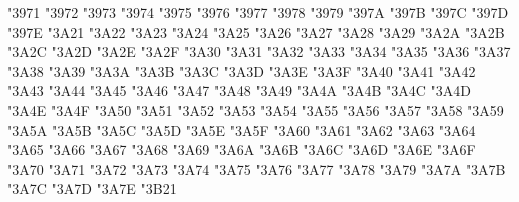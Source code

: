 {\Uchar\jis"3971 %
\Uchar\jis"3972 %
\Uchar\jis"3973 %
\Uchar\jis"3974 %
\Uchar\jis"3975 %
\Uchar\jis"3976 %
\Uchar\jis"3977 %
\Uchar\jis"3978 %
\Uchar\jis"3979 %
\Uchar\jis"397A %
\Uchar\jis"397B %
\Uchar\jis"397C %
\Uchar\jis"397D %
\Uchar\jis"397E %
\Uchar\jis"3A21 %
\Uchar\jis"3A22 %
\Uchar\jis"3A23 %
\Uchar\jis"3A24 %
\Uchar\jis"3A25 %
\Uchar\jis"3A26 %
\Uchar\jis"3A27 %
\Uchar\jis"3A28 %
\Uchar\jis"3A29 %
\Uchar\jis"3A2A %
\Uchar\jis"3A2B %
\Uchar\jis"3A2C %
\Uchar\jis"3A2D %
\Uchar\jis"3A2E %
\Uchar\jis"3A2F %
\Uchar\jis"3A30 %
\Uchar\jis"3A31 %
\Uchar\jis"3A32 %
\Uchar\jis"3A33 %
\Uchar\jis"3A34 %
\Uchar\jis"3A35 %
\Uchar\jis"3A36 %
\Uchar\jis"3A37 %
\Uchar\jis"3A38 %
\Uchar\jis"3A39 %
\Uchar\jis"3A3A %
\Uchar\jis"3A3B %
\Uchar\jis"3A3C %
\Uchar\jis"3A3D %
\Uchar\jis"3A3E %
\Uchar\jis"3A3F %
\Uchar\jis"3A40 %
\Uchar\jis"3A41 %
\Uchar\jis"3A42 %
\Uchar\jis"3A43 %
\Uchar\jis"3A44 %
\Uchar\jis"3A45 %
\Uchar\jis"3A46 %
\Uchar\jis"3A47 %
\Uchar\jis"3A48 %
\Uchar\jis"3A49 %
\Uchar\jis"3A4A %
\Uchar\jis"3A4B %
\Uchar\jis"3A4C %
\Uchar\jis"3A4D %
\Uchar\jis"3A4E %
\Uchar\jis"3A4F %
\Uchar\jis"3A50 %
\Uchar\jis"3A51 %
\Uchar\jis"3A52 %
\Uchar\jis"3A53 %
\Uchar\jis"3A54 %
\Uchar\jis"3A55 %
\Uchar\jis"3A56 %
\Uchar\jis"3A57 %
\Uchar\jis"3A58 %
\Uchar\jis"3A59 %
\Uchar\jis"3A5A %
\Uchar\jis"3A5B %
\Uchar\jis"3A5C %
\Uchar\jis"3A5D %
\Uchar\jis"3A5E %
\Uchar\jis"3A5F %
\Uchar\jis"3A60 %
\Uchar\jis"3A61 %
\Uchar\jis"3A62 %
\Uchar\jis"3A63 %
\Uchar\jis"3A64 %
\Uchar\jis"3A65 %
\Uchar\jis"3A66 %
\Uchar\jis"3A67 %
\Uchar\jis"3A68 %
\Uchar\jis"3A69 %
\Uchar\jis"3A6A %
\Uchar\jis"3A6B %
\Uchar\jis"3A6C %
\Uchar\jis"3A6D %
\Uchar\jis"3A6E %
\Uchar\jis"3A6F %
\Uchar\jis"3A70 %
\Uchar\jis"3A71 %
\Uchar\jis"3A72 %
\Uchar\jis"3A73 %
\Uchar\jis"3A74 %
\Uchar\jis"3A75 %
\Uchar\jis"3A76 %
\Uchar\jis"3A77 %
\Uchar\jis"3A78 %
\Uchar\jis"3A79 %
\Uchar\jis"3A7A %
\Uchar\jis"3A7B %
\Uchar\jis"3A7C %
\Uchar\jis"3A7D %
\Uchar\jis"3A7E %
\Uchar\jis"3B21 %
}
